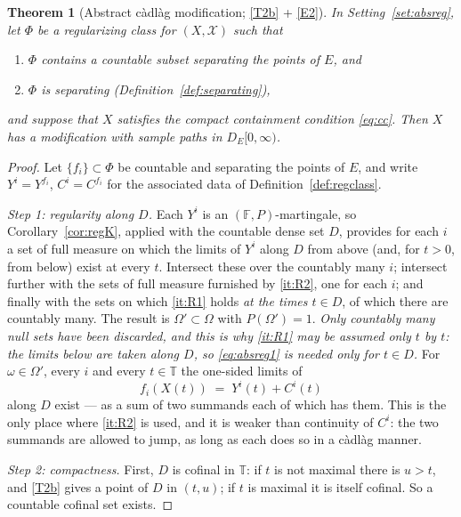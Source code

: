 \documentclass[11pt,a4paper]{article}
\theoremstyle{plain}
\newtheorem{theorem}{Theorem}[section]
\theoremstyle{definition}
\theoremstyle{remark}
\newcommand{\T}{\mathbb{T}}                     %
\newcommand{\DE}{D_E[0,\infty)}
\newcommand{\XX}{\mathcal{X}}                  %
\begin{document}
\begin{theorem}[Abstract c\`adl\`ag modification; \eqref{T2b} + \eqref{E2}]
  \label{thm:absreg}
  In Setting~\ref{set:absreg}, let $\Phi$ be a regularizing class for
  $(X,\XX)$ such that
  \begin{enumerate}[label=(\alph*)]
  \item $\Phi$ contains a countable subset separating the points of $E$, and
  \item $\Phi$ is separating (Definition~\ref{def:separating}),
  \end{enumerate}
  and suppose that $X$ satisfies the compact containment condition \eqref{eq:cc}.
  Then $X$ has a modification with sample paths in $\DE$.
\end{theorem}

\begin{proof}
  Let $\{f_i\} \subset \Phi$ be countable and separating the points of $E$, and
  write $Y^i = Y^{f_i}$, $C^i = C^{f_i}$ for the associated data of
  Definition~\ref{def:regclass}.

  \emph{Step 1: regularity along $D$.}
  Each $Y^i$ is an $(\mathbb{F},P)$-martingale, so Corollary~\ref{cor:regK},
  applied with the countable dense set $D$, provides for each $i$ a set of full
  measure on which the limits of $Y^i$ along $D$ from above (and, for $t>0$, from
  below) exist at every $t$.  Intersect these over the
  countably many $i$; intersect further with the sets of full measure furnished by
  \ref{it:R2}, one for each $i$; and finally with the sets on which \ref{it:R1}
  holds \emph{at the times $t \in D$}, of which there are countably many.  The
  result is $\Omega' \subset \Omega$ with $P(\Omega')=1$.  \emph{Only countably
  many null sets have been discarded, and this is why \ref{it:R1} may be assumed
  only $t$ by $t$: the limits below are taken along $D$, so \eqref{eq:absreg1} is
  needed only for $t \in D$.}  For $\omega \in \Omega'$, every $i$ and every
  $t \in \T$ the one-sided limits of
  \begin{equation}
    \label{eq:absreg1}
    f_i(X(t)) \;=\; Y^i(t) + C^i(t)
  \end{equation}
  along $D$ exist --- as a sum of two summands each of which has them.  This is
  the only place where \ref{it:R2} is used, and it is weaker than continuity of
  $C^i$: the two summands are allowed to jump, as long as each does so in a
  c\`adl\`ag manner.

  \emph{Step 2: compactness.}
  First, $D$ is cofinal in $\T$: if $t$ is not maximal there is $u > t$, and
  \eqref{T2b} gives a point of $D$ in $(t,u)$; if $t$ is maximal it is itself cofinal.
  So a countable cofinal set exists.


\end{proof}
\end{document}
